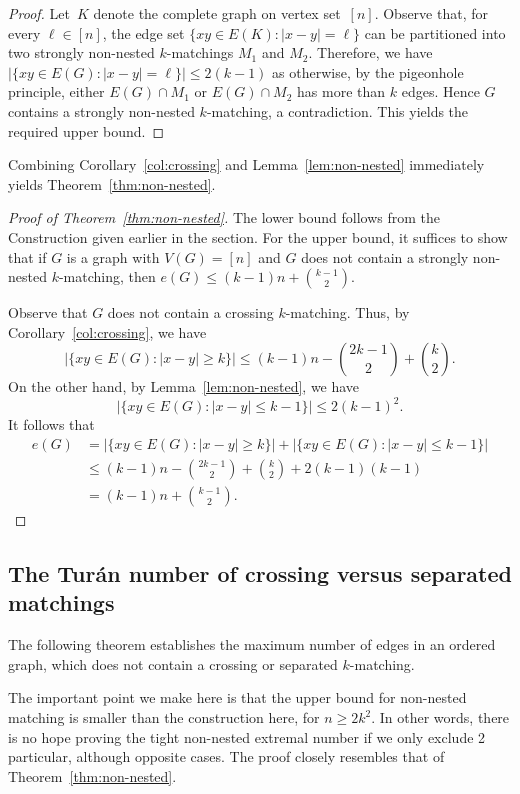 \documentclass[11pt]{article}
\theoremstyle{definition}
\begin{document}
\begin{proof}
    Let~$K$ denote the complete graph on vertex set~$[n]$. 
    Observe that, for every $\ell\in[n]$, the edge set $\{xy\in E(K):|x-y|=\ell\}$ can be partitioned into two strongly non-nested $k$-matchings $M_1$ and $M_2$.
    Therefore, we have $|\{xy\in E(G):|x-y|=\ell\}|\le 2(k-1)$ as otherwise, by the pigeonhole principle, either $E(G)\cap M_1$ or $E(G)\cap M_2$ has more than $k$ edges.
    Hence $G$ contains a strongly non-nested $k$-matching, a contradiction.
    This yields the required upper bound.
\end{proof}

Combining Corollary~\ref{col:crossing} and Lemma~\ref{lem:non-nested} immediately yields Theorem~\ref{thm:non-nested}.

\begin{proof}[Proof of Theorem~\ref{thm:non-nested}]
    The lower bound follows from the Construction given earlier in the section.
    For the upper bound, it suffices to show that if $G$ is a graph with $V(G)=[n]$ and $G$ does not contain a strongly non-nested $k$-matching, then $e(G)\le(k-1)n+\binom{k-1}{2}$.
    
    Observe that $G$ does not contain a crossing $k$-matching.
    Thus, by Corollary~\ref{col:crossing}, we have  
    $$|\{xy\in E(G):|x-y|\ge k\}|\le(k-1)n-\binom{2k-1}{2}+\binom{k}{2}.$$
    On the other hand, by Lemma~\ref{lem:non-nested}, we have
    $$|\{xy\in E(G):|x-y|\le k-1\}|\le2(k-1)^2.$$
    It follows that
    \begin{align*}
    e(G) & =|\{xy\in E(G):|x-y|\ge k\}|+|\{xy\in E(G):|x-y|\le k-1\}|\\
    & \le(k-1)n-\binom{2k-1}{2}+\binom{k}{2}+2(k-1)(k-1)\\
    & =(k-1)n+\binom{k-1}{2}.
    \end{align*}
\end{proof}

\subsection{The Tur\'an number of crossing versus separated matchings}

The following theorem establishes the maximum number of edges in an ordered graph, which does not contain a crossing or separated $k$-matching.

The important point we make here is that the upper bound for non-nested matching is smaller than the construction here, for $n\ge 2k^2$. 
In other words, there is no hope proving the tight non-nested extremal number if we only exclude 2 particular, although opposite cases.
The proof closely resembles that of Theorem~\ref{thm:non-nested}.
\end{document}
